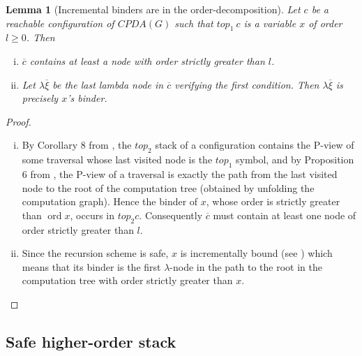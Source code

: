\documentclass{article}
\newcommand{\ord}{\mathop{\mathrm{ord}}}
\newtheorem{lemma}{Lemma}[section]
\theoremstyle{remark}
\theoremstyle{definition}
\newcommand\orddec\overline
\begin{document}
\begin{lemma}[Incremental binders are in the order-decomposition]
\label{lem:binder_in_ordecompos} Let $c$ be a reachable
configuration of $CPDA(G)$ such that $top_1\
c$ is a variable $x$ of order $l\geq 0$. Then
\begin{enumerate}[i.]
\item $\orddec{c}$ contains at least a node with order strictly
greater than $l$.
\item Let $\lambda \overline{\xi}$ be the last lambda node
in $\orddec{c}$ verifying the first condition. Then $\lambda \overline{\xi}$ is precisely $x$'s binder.
\end{enumerate}
\end{lemma}
\begin{proof}
\begin{enumerate}[i.]
\item By Corollary 8 from \cite{hague-sto07}, the $top_2$
     stack of a configuration contains the P-view of some
    traversal whose last visited node is the $top_1$ symbol, and
    by Proposition 6 from \cite{OngLics2006}, the P-view of a
    traversal is exactly the path from the last visited node to
    the root of the computation tree (obtained by unfolding the
    computation graph). Hence the binder of $x$, whose order
    is strictly greater than $\ord{x}$, occurs in $top_2 c$.
    Consequently $\orddec{c}$ must contain at least one node of order strictly greater than $l$.

\item Since the recursion scheme is safe, $x$ is
 incrementally bound (see \cite{blumong:safelambdacalculus})
 which means that its binder is the first $\lambda$-node in the
 path to the root in the computation tree with order strictly
 greater than $x$.
\end{enumerate}
\end{proof}

\subsection{Safe higher-order stack}
\end{document}

